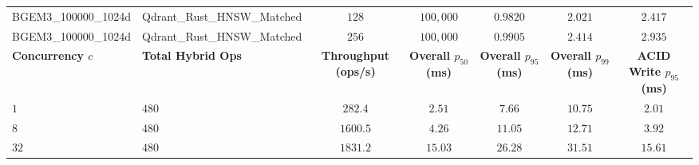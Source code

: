 \documentclass[10pt,journal,compsoc]{IEEEtran}
\begin{document}
\begin{table}[!t]
\begin{adjustbox}{max width=\textwidth}
\begin{tabular}{@{}llccccc@{}}
BGEM3\_100000\_1024d & Qdrant\_Rust\_HNSW\_Matched & $128$ & $100,000$ & $0.9820$ & $2.021$ & $2.417$ \\
BGEM3\_100000\_1024d & Qdrant\_Rust\_HNSW\_Matched & $256$ & $100,000$ & $0.9905$ & $2.414$ & $2.935$ \\
\midrule
\textbf{Concurrency $c$} & \textbf{Total Hybrid Ops} & \textbf{Throughput (ops/s)} & \textbf{Overall $p_{50}$ (ms)} & \textbf{Overall $p_{95}$ (ms)} & \textbf{Overall $p_{99}$ (ms)} & \textbf{ACID Write $p_{95}$ (ms)} \\
\midrule
$1$ & $480$ & $282.4$ & $2.51$ & $7.66$ & $10.75$ & $2.01$ \\
$8$ & $480$ & $1600.5$ & $4.26$ & $11.05$ & $12.71$ & $3.92$ \\
$32$ & $480$ & $1831.2$ & $15.03$ & $26.28$ & $31.51$ & $15.61$ \\
\bottomrule
\end{tabular}
\end{adjustbox}
\end{table}
\end{document}
